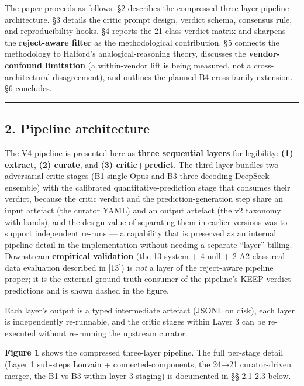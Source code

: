 \documentclass[
  letterpaper,
  11pt]{article}
\begin{document}
The paper proceeds as follows. §2 describes the compressed three-layer
pipeline architecture. §3 details the critic prompt design, verdict
schema, consensus rule, and reproducibility hooks. §4 reports the
21-class verdict matrix and sharpens the \textbf{reject-aware filter} as
the methodological contribution. §5 connects the methodology to
Halford's analogical-reasoning theory, discusses the
\textbf{vendor-confound limitation} (a within-vendor lift is being
measured, not a cross-architectural disagreement), and outlines the
planned B4 cross-family extension. §6 concludes.

\begin{center}\rule{0.5\linewidth}{0.5pt}\end{center}

\subsection{2. Pipeline architecture}\label{pipeline-architecture}

The V4 pipeline is presented here as \textbf{three sequential layers}
for legibility: \textbf{(1) extract}, \textbf{(2) curate}, and
\textbf{(3) critic+predict}. The third layer bundles two adversarial
critic stages (B1 single-Opus and B3 three-decoding DeepSeek ensemble)
with the calibrated quantitative-prediction stage that consumes their
verdict, because the critic verdict and the prediction-generation step
share an input artefact (the curator YAML) and an output artefact (the
v2 taxonomy with bands), and the design value of separating them in
earlier versions was to support independent re-runs --- a capability
that is preserved as an internal pipeline detail in the implementation
without needing a separate ``layer'' billing. Downstream
\textbf{empirical validation} (the 13-system + 4-null + 2 A2-class
real-data evaluation described in {[}13{]}) is \emph{not} a layer of the
reject-aware pipeline proper; it is the external ground-truth consumer
of the pipeline's KEEP-verdict predictions and is shown dashed in the
figure.

Each layer's output is a typed intermediate artefact (JSONL on disk),
each layer is independently re-runnable, and the critic stages within
Layer 3 can be re-executed without re-running the upstream curator.

\textbf{Figure 1} shows the compressed three-layer pipeline. The full
per-stage detail (Layer 1 sub-steps Louvain + connected-components, the
24→21 curator-driven merger, the B1-vs-B3 within-layer-3 staging) is
documented in §§ 2.1-2.3 below.
\end{document}
